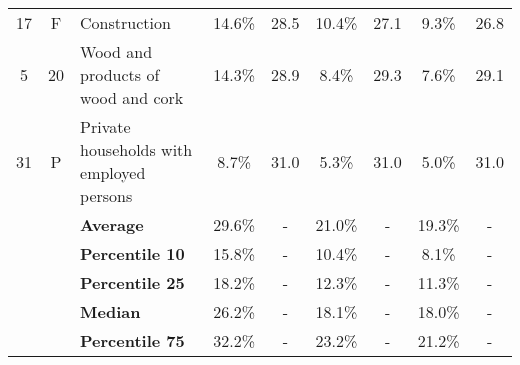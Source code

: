 \documentclass[10pt]{article}
\begin{document}
\begin{table}[!h]
{\begin{tabular}{cc|lcccccc}
17                                & F                         & \multicolumn{1}{l|}{Construction}                                                           & 14.6\% & \multicolumn{1}{c|}{28.5}                        & 10.4\% & \multicolumn{1}{c|}{27.1}                        & 9.3\%               & 26.8              \\
5                                 & 20                        & \multicolumn{1}{l|}{Wood and products of wood and cork}                                     & 14.3\% & \multicolumn{1}{c|}{28.9}                        & 8.4\%  & \multicolumn{1}{c|}{29.3}                        & 7.6\%               & 29.1              \\
31                                & P                         & \multicolumn{1}{l|}{Private households with employed persons}                               & 8.7\%  & \multicolumn{1}{c|}{31.0}                        & 5.3\%  & \multicolumn{1}{c|}{31.0}                        & 5.0\%               & 31.0              \\ \hline
\multicolumn{1}{l}{\textbf{}}     & \multicolumn{1}{l|}{}     & \multicolumn{1}{l|}{\textbf{Average}}                                                       & 29.6\% & \multicolumn{1}{c|}{-}                           & 21.0\% & \multicolumn{1}{c|}{-}                           & 19.3\%              & -                 \\
\multicolumn{1}{l}{\textbf{}}     & \multicolumn{1}{l|}{}     & \multicolumn{1}{l|}{\textbf{Percentile 10}}                                                 & 15.8\% & \multicolumn{1}{c|}{-}                           & 10.4\% & \multicolumn{1}{c|}{-}                           & 8.1\%               & -                 \\
\multicolumn{1}{l}{\textbf{}}     & \multicolumn{1}{l|}{}     & \multicolumn{1}{l|}{\textbf{Percentile 25}}                                                 & 18.2\% & \multicolumn{1}{c|}{-}                           & 12.3\% & \multicolumn{1}{c|}{-}                           & 11.3\%              & -                 \\
\multicolumn{1}{l}{\textbf{}}     & \multicolumn{1}{l|}{}     & \multicolumn{1}{l|}{\textbf{Median}}                                                        & 26.2\% & \multicolumn{1}{c|}{-}                           & 18.1\% & \multicolumn{1}{c|}{-}                           & 18.0\%              & -                 \\
\multicolumn{1}{l}{\textbf{}}     & \multicolumn{1}{l|}{}     & \multicolumn{1}{l|}{\textbf{Percentile 75}}                                                 & 32.2\% & \multicolumn{1}{c|}{-}                           & 23.2\% & \multicolumn{1}{c|}{-}                           & 21.2\%              & -                 \\

\end{tabular}}
\end{table}
\end{document}
